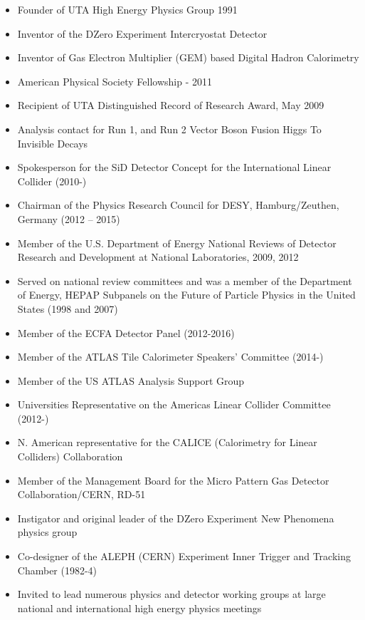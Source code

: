 
\vspace*{0.1in}
\begin{itemize}[noitemsep,nolistsep]

\item{Founder of UTA High Energy Physics Group 1991}
\item{Inventor of the DZero Experiment Intercryostat Detector}
\item{Inventor of Gas Electron Multiplier (GEM) based Digital Hadron Calorimetry}
\item{American Physical Society Fellowship - 2011}
\item{Recipient of UTA Distinguished Record of Research Award, May 2009}
\item{Analysis contact for Run 1, and Run 2 Vector Boson Fusion Higgs To Invisible Decays}
\item{Spokesperson for the SiD Detector Concept for the International Linear Collider (2010-)}
\item{Chairman of the Physics Research Council for DESY, Hamburg/Zeuthen, Germany (2012 – 2015)}
\item{Member of the U.S. Department of Energy National Reviews of Detector Research and Development at National Laboratories, 2009, 2012}
\item{Served on national review committees and was a member of the Department of Energy, HEPAP Subpanels on the Future of Particle Physics in the United States (1998 and 2007)}
\item{Member of the ECFA Detector Panel (2012-2016)}
\item{Member of the ATLAS Tile Calorimeter Speakers' Committee (2014-) }
\item{Member of the US ATLAS Analysis Support Group}
\item{Universities Representative on the Americas Linear Collider Committee (2012-) }
\item{N. American representative for the CALICE (Calorimetry for Linear Colliders) Collaboration}
\item{Member of the Management Board for the Micro Pattern Gas Detector Collaboration/CERN, RD-51}
\item{Instigator and original leader of the DZero Experiment New Phenomena physics group}
\item{Co-designer of the ALEPH (CERN) Experiment Inner Trigger and Tracking Chamber (1982-4)}
\item{Invited to lead numerous physics and detector working groups at large national and international high energy physics meetings}

\end{itemize}

